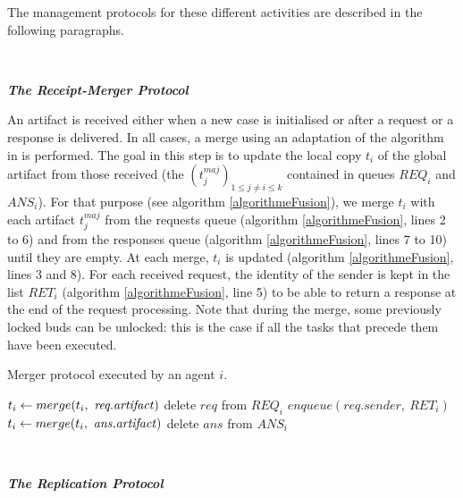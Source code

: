 The management protocols for these different activities are described in the following paragraphs.

~

\noindent\textbf{\textit{The Receipt-Merger Protocol}}

An artifact is received either when a new case is initialised or after a request or a response is delivered. In all cases, a merge using an adaptation of the algorithm in \cite{badouelTchoupeCmcs} is performed. The goal in this step is to update the local copy $t_i$ of the global artifact from those received (the $(t^{maj}_j)_{1 \leq j \neq i \leq k}$ contained in queues $REQ_i$ and $ANS_i$). 
For that purpose (see algorithm \ref{algorithmeFusion}), we merge $t_i$ with each artifact $t^{maj}_j$ from the requests queue (algorithm \ref{algorithmeFusion}, lines 2 to 6) and from the responses queue (algorithm \ref{algorithmeFusion}, lines 7 to 10) until they are empty. 
At each merge, $t_i$ is updated (algorithm \ref{algorithmeFusion}, lines 3 and 8). 
For each received request, the identity of the sender is kept in the list $RET_i$ (algorithm \ref{algorithmeFusion}, line 5) to be able to return a response at the end of the request processing.
Note that during the merge, some previously locked buds can be unlocked: this is the case if all the tasks that precede them have been executed.

\begin{algorithm}
\small
\caption{Merger protocol executed by an agent $i$.\label{algorithmeFusion}}
\begin{algorithmic}[1]
			\State $t_i \gets merge(t_i,~\textrm{\textit{req.artifact}})$
			\State delete $req$ from $REQ_i$
			\State $enqueue(req.sender,~RET_i)$
		\EndFor
			\State $t_i \gets merge(t_i,~\textrm{\textit{ans.artifact}})$
			\State delete $ans$ from $ANS_i$
		\EndFor
	\EndProcedure
\end{algorithmic}
\end{algorithm}

~

\noindent\textbf{\textit{The Replication Protocol}}

